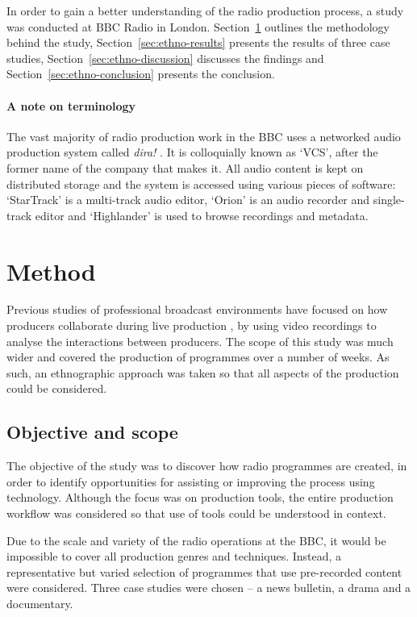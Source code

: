In order to gain a better understanding of the radio production process, a study was conducted at BBC Radio in London.
Section~\ref{sec:ethno-method} outlines the methodology behind the study, Section~\ref{sec:ethno-results}
presents the results of three case studies, Section~\ref{sec:ethno-discussion} discusses the findings and
Section~\ref{sec:ethno-conclusion} presents the conclusion.

\paragraph{A note on terminology}
The vast majority of radio production work in the BBC uses a networked audio production system called \textit{dira!}
\citep{SCISYS2015}. It is colloquially known as `VCS', after the former name of the company that makes it. All audio
content is kept on distributed storage and the system is accessed using various pieces of software: `StarTrack' is a
multi-track audio editor, `Orion' is an audio recorder and single-track editor and `Highlander' is used to browse
recordings and metadata. 

\section{Method}\label{sec:ethno-method}
Previous studies of professional broadcast environments have focused on how producers collaborate during live
production \citep{Engstroem2010,Perry2009}, by using video recordings to analyse the interactions between producers.
The scope of this study was much wider and covered the production of programmes over a number of weeks. As such, an
ethnographic approach was taken so that all aspects of the production could be considered.

\subsection{Objective and scope}
The objective of the study was to discover how radio programmes are created, in order to identify opportunities for
assisting or improving the process using technology. Although the focus was on production tools, the entire production
workflow was considered so that use of tools could be understood in context.

Due to the scale and variety of the radio operations at the BBC, it would be impossible to cover all production genres
and techniques.  Instead, a representative but varied selection of programmes that use pre-recorded content were
considered. Three case studies were chosen --  a news bulletin, a drama and a documentary.

